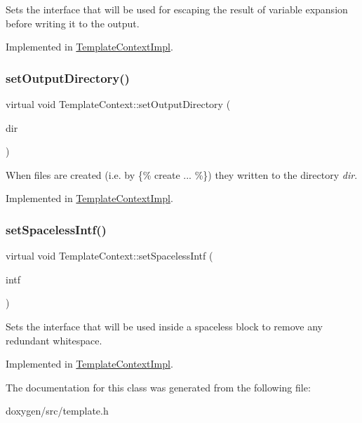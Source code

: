 Sets the interface that will be used for escaping the result of variable expansion before writing it to the output. 

Implemented in \mbox{\hyperlink{class_template_context_impl_a812fdb58baecd7830e42ef8508a005e8}{Template\+Context\+Impl}}.

\mbox{\label{class_template_context_ab3aaaa03df934615ccfa3209420cd93d}} 
\subsubsection{\texorpdfstring{setOutputDirectory()}{setOutputDirectory()}}
{\footnotesize\ttfamily virtual void Template\+Context\+::set\+Output\+Directory (\begin{DoxyParamCaption}\item[{const \mbox{\hyperlink{class_q_c_string}{Q\+C\+String}} \&}]{dir }\end{DoxyParamCaption})\hspace{0.3cm}{\ttfamily [pure virtual]}}

When files are created (i.\+e. by \{\% create ... \%\}) they written to the directory {\itshape dir}. 

Implemented in \mbox{\hyperlink{class_template_context_impl_a1178c98a679ecb3e02722b4e8f39c1e3}{Template\+Context\+Impl}}.

\mbox{\label{class_template_context_a11e64f588d21aeda2b57a4bc4e06ecc7}} 
\subsubsection{\texorpdfstring{setSpacelessIntf()}{setSpacelessIntf()}}
{\footnotesize\ttfamily virtual void Template\+Context\+::set\+Spaceless\+Intf (\begin{DoxyParamCaption}\item[{\mbox{\hyperlink{class_template_spaceless_intf}{Template\+Spaceless\+Intf}} $\ast$}]{intf }\end{DoxyParamCaption})\hspace{0.3cm}{\ttfamily [pure virtual]}}

Sets the interface that will be used inside a spaceless block to remove any redundant whitespace. 

Implemented in \mbox{\hyperlink{class_template_context_impl_a70bde90b2b3c08769cd0c7587ffaf33a}{Template\+Context\+Impl}}.



The documentation for this class was generated from the following file\+:\begin{DoxyCompactItemize}
\item 
doxygen/src/template.\+h\end{DoxyCompactItemize}
